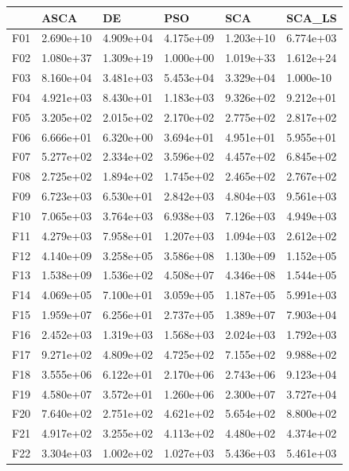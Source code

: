 \begin{tabular}{llllll}
\toprule
{} &       ASCA &         DE &        PSO &        SCA &     SCA\_LS \\
\midrule
F01  &  2.690e+10 &  4.909e+04 &  4.175e+09 &  1.203e+10 &  6.774e+03 \\
F02  &  1.080e+37 &  1.309e+19 &  1.000e+00 &  1.019e+33 &  1.612e+24 \\
F03  &  8.160e+04 &  3.481e+03 &  5.453e+04 &  3.329e+04 &  1.000e-10 \\
F04  &  4.921e+03 &  8.430e+01 &  1.183e+03 &  9.326e+02 &  9.212e+01 \\
F05  &  3.205e+02 &  2.015e+02 &  2.170e+02 &  2.775e+02 &  2.817e+02 \\
F06  &  6.666e+01 &  6.320e+00 &  3.694e+01 &  4.951e+01 &  5.955e+01 \\
F07  &  5.277e+02 &  2.334e+02 &  3.596e+02 &  4.457e+02 &  6.845e+02 \\
F08  &  2.725e+02 &  1.894e+02 &  1.745e+02 &  2.465e+02 &  2.767e+02 \\
F09  &  6.723e+03 &  6.530e+01 &  2.842e+03 &  4.804e+03 &  9.561e+03 \\
F10  &  7.065e+03 &  3.764e+03 &  6.938e+03 &  7.126e+03 &  4.949e+03 \\
F11  &  4.279e+03 &  7.958e+01 &  1.207e+03 &  1.094e+03 &  2.612e+02 \\
F12  &  4.140e+09 &  3.258e+05 &  3.586e+08 &  1.130e+09 &  1.152e+05 \\
F13  &  1.538e+09 &  1.536e+02 &  4.508e+07 &  4.346e+08 &  1.544e+05 \\
F14  &  4.069e+05 &  7.100e+01 &  3.059e+05 &  1.187e+05 &  5.991e+03 \\
F15  &  1.959e+07 &  6.256e+01 &  2.737e+05 &  1.389e+07 &  7.903e+04 \\
F16  &  2.452e+03 &  1.319e+03 &  1.568e+03 &  2.024e+03 &  1.792e+03 \\
F17  &  9.271e+02 &  4.809e+02 &  4.725e+02 &  7.155e+02 &  9.988e+02 \\
F18  &  3.555e+06 &  6.122e+01 &  2.170e+06 &  2.743e+06 &  9.123e+04 \\
F19  &  4.580e+07 &  3.572e+01 &  1.260e+06 &  2.300e+07 &  3.727e+04 \\
F20  &  7.640e+02 &  2.751e+02 &  4.621e+02 &  5.654e+02 &  8.800e+02 \\
F21  &  4.917e+02 &  3.255e+02 &  4.113e+02 &  4.480e+02 &  4.374e+02 \\
F22  &  3.304e+03 &  1.002e+02 &  1.027e+03 &  5.436e+03 &  5.461e+03 \\

\end{tabular}
